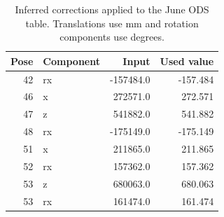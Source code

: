 \begin{table}[!htbp]\centering\footnotesize\setlength{\tabcolsep}{4pt}
\caption{Inferred corrections applied to the June ODS table. Translations use mm and rotation components use degrees.}\label{tab:corrections}
\begin{tabular}{rlrr}
\toprule
Pose & Component & Input & Used value \\
\midrule
42 & rx & -157484.0 & -157.484 \\
46 & x & 272571.0 & 272.571 \\
47 & z & 541882.0 & 541.882 \\
48 & rx & -175149.0 & -175.149 \\
51 & x & 211865.0 & 211.865 \\
52 & rx & 157362.0 & 157.362 \\
53 & z & 680063.0 & 680.063 \\
53 & rx & 161474.0 & 161.474 \\
\bottomrule
\end{tabular}
\end{table}
